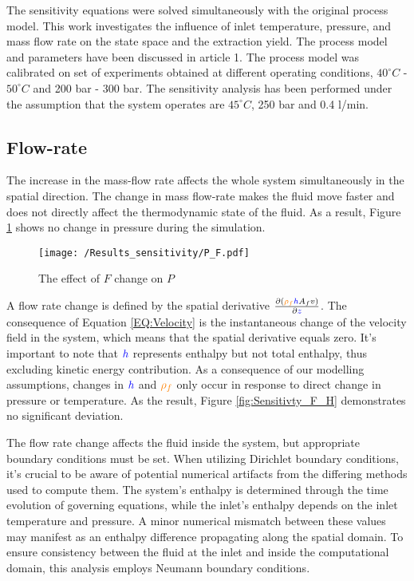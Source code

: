 \documentclass[../Article_Model_Parameters.tex]{subfiles}
\begin{document}
	
	\label{CH: Results}
	
	The sensitivity equations were solved simultaneously with the original process model. This work investigates the influence of inlet temperature, pressure, and mass flow rate on the state space and the extraction yield. The process model and parameters have been discussed in {\color{red}article 1}. The process model was calibrated on set of experiments obtained at different operating conditions, $40^\circ C$ - $50^\circ C$ and 200 bar - 300 bar. The sensitivity analysis has been performed under the assumption that the system operates are $45^\circ C$, 250 bar and 0.4 l/min. 
	
	\subsection{Flow-rate}
	
	The increase in the mass-flow rate affects the whole system simultaneously in the spatial direction. The change in mass flow-rate makes the fluid move faster and does not directly affect the thermodynamic state of the fluid. As a result, Figure \ref{fig:Sensitivty_F_P} shows no change in pressure during the simulation. 
    
    \begin{figure}[h!]
    	\centering
    	\texttt{[image: /Results\_sensitivity/P\_F.pdf]}
    	\caption{The effect of $F$ change on $P$}
    	\label{fig:Sensitivty_F_P}
    \end{figure}
    
    A flow rate change is defined by the spatial derivative $\frac{\partial \left( {\color{orange}\rho_f}{\color{blue}h} A_f v \right)}{\partial {\color{blue}z}}$. The consequence of Equation \ref{EQ:Velocity} is the instantaneous change of the velocity field in the system, which means that the spatial derivative equals zero. It's important to note that ${\color{blue}h}$ represents enthalpy but not total enthalpy, thus excluding kinetic energy contribution. As a consequence of our modelling assumptions, changes in ${\color{blue}h}$ and ${\color{orange}\rho_f}$ only occur in response to direct change in pressure or temperature. As the result, Figure \ref{fig:Sensitivty_F_H} demonstrates no significant deviation.
    
    The flow rate change affects the fluid inside the system, but appropriate boundary conditions must be set. When utilizing Dirichlet boundary conditions, it's crucial to be aware of potential numerical artifacts from the differing methods used to compute them. The system's enthalpy is determined through the time evolution of governing equations, while the inlet's enthalpy depends on the inlet temperature and pressure. A minor numerical mismatch between these values may manifest as an enthalpy difference propagating along the spatial domain. To ensure consistency between the fluid at the inlet and inside the computational domain, this analysis employs Neumann boundary conditions.
        
\end{document}
